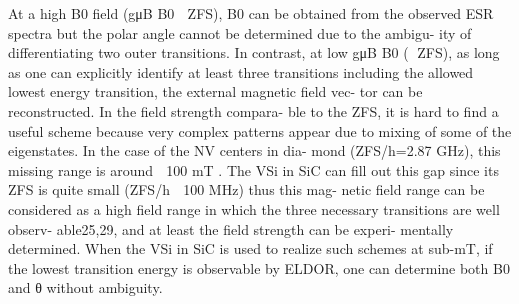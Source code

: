 \begin{group}
    \color{gray}
At a high B0 field (gμB B0  ZFS),
B0 can be obtained from the observed ESR spectra but
the polar angle cannot be determined due to the ambigu-
ity of differentiating two outer transitions. In contrast,
at low gμB B0 ( ZFS), as long as one can explicitly
identify at least three transitions including the allowed
lowest energy transition, the external magnetic field vec-
tor can be reconstructed. In the field strength compara-
ble to the ZFS, it is hard to find a useful scheme because
very complex patterns appear due to mixing of some of
the eigenstates. In the case of the NV centers in dia-
mond (ZFS/h=2.87 GHz), this missing range is around
∼ 100 mT . The VSi in SiC can fill out this gap since its
ZFS is quite small (ZFS/h ∼ 100 MHz) thus this mag-
netic field range can be considered as a high field range
in which the three necessary transitions are well observ-
able25,29, and at least the field strength can be experi-
mentally determined. When the VSi in SiC is used to
realize such schemes at sub-mT, if the lowest transition
energy is observable by ELDOR, one can determine both
B0 and θ without ambiguity. 
\end{group}


\cite{Isoya2008}





